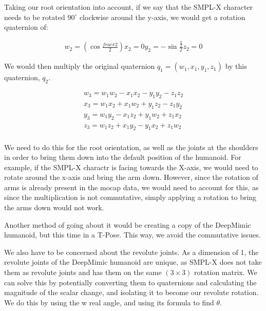 \documentclass{l4proj}
\begin{document}
Taking our root orientation into account, if we say that the SMPL-X character needs to be rotated $90^{\circ}$ clockwise around the y-axis, we would get a rotation quaternion of:

\begin{equation}
  \begin{aligned}
    w_2 = (\cos\frac{frac{\pi}{2}}{2})
    x_2 = 0
    y_2 = -\sin\frac{\frac{\pi}{2}}{2}
    z_2 = 0
\end{aligned}
\end{equation}

We would then multiply the original quaternion $q_1 = (w_1, x_1, y_1, z_1)$ by this quaternion, $q_2$.

\begin{equation}
  \begin{aligned}
    w_3 = w_1w_2 - x_1x_2 - y_1y_2 - z_1z_2\\
    x_3 = w_1x_2 + x_1w_2 + y_1z_2 - z_1y_2\\
    y_3 = w_1y_2 - x_1z_2 + y_1w_2 + z_1x_2\\
    z_3 = w_1z_2 + x_1y_2 - y_1x_2 + z_1w_2\\
  \end{aligned}
\end{equation}

We need to do this for the root orientation, as well as the joints at the shoulders in order to bring them down into the default position of the humanoid. For example, if the SMPL-X charactr is facing towards the X-axis, we would need to rotate around the x-axis and bring the arm down. However, since the rotation of arms is already present in the mocap data, we would need to account for this, as since the multiplication is not commutative, simply applying a rotation to bring the arms down would not work.

Another method of going about it would be creating a copy of the DeepMimic humanoid, but this time in a T-Pose. This way, we avoid the commutative issues.

We also have to be concerned about the revolute joints. As a dimension of 1, the revolute joints of the DeepMimic humanoid are unique, as SMPL-X does not take them as revolute joints and has them on the same $(3\times3)$ rotation matrix. We can solve this by potentially converting them to quaternions and calculating the magnitude of the scalar change, and isolating it to become our revolute rotation. We do this by using the w real angle, and using its formula to find $\theta$.
\end{document}
